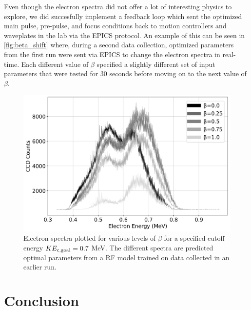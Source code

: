 Even though the electron spectra did not offer a lot of interesting physics to explore, we did succesfully implement a feedback loop which sent the optimized main pulse, pre-pulse, and focus conditions back to motion controllers and waveplates in the lab via the \gls{EPICS} protocol. An example of this can be seen in \autoref{fig:beta_shift} where, during a second data collection, optimized parameters from the first run were sent via \gls{EPICS} to change the electron spectra in real-time. Each different value of $\beta$ specified a slightly different set of input parameters that were tested for 30 seconds before moving on to the next value of $\beta$.

\begin{figure}
	\centering 
	\includegraphics[width=\linewidth]{planning/images/daq/rf_beta_shift.jpg}
	\caption{Electron spectra plotted for various levels of $\beta$ for a specified cutoff energy $KE_{\rm c,goal} = 0.7$ MeV. The different spectra are predicted optimal parameters from a \gls{RF} model trained on data collected in an earlier run.}
	\label{fig:beta_shift}
\end{figure}

\section{Conclusion}